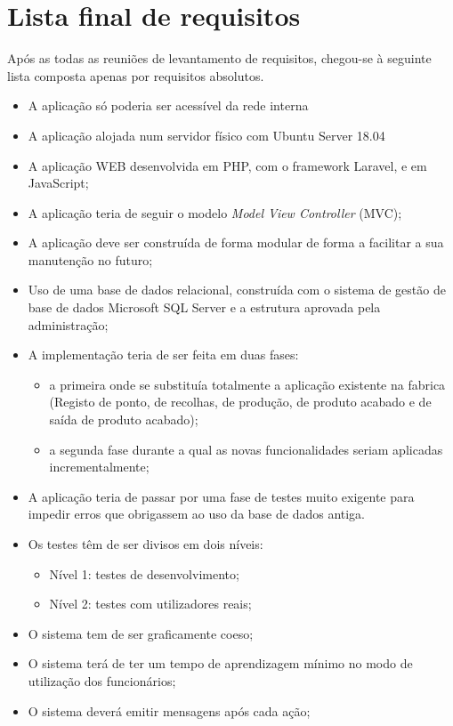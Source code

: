 \section{Lista final de requisitos}
Após as todas as reuniões de levantamento de requisitos, chegou-se à seguinte lista composta apenas por requisitos absolutos.
\begin{itemize}
	\item A aplicação só poderia ser acessível da rede interna
	\item A aplicação alojada num servidor físico com Ubuntu Server 18.04
	\item A aplicação WEB desenvolvida em PHP, com o framework Laravel, e em JavaScript;
	\item A aplicação teria de seguir o modelo \textit{Model View Controller} (MVC\label{sym:MVC});
	\item A aplicação deve ser construída de forma modular de forma a facilitar a sua manutenção no futuro;
	\item Uso de uma base de dados relacional, construída com o sistema de gestão de base de dados Microsoft SQL Server e a estrutura aprovada pela administração;
	\item A implementação teria de ser feita em duas fases:
	\begin{itemize}
		\item a primeira onde se substituía totalmente a aplicação existente na fabrica (Registo de ponto, de recolhas, de produção, de produto acabado e de saída de produto acabado);
		\item a segunda fase durante a qual as novas funcionalidades seriam aplicadas incrementalmente;
	\end{itemize}
	\item A aplicação teria de passar por uma fase de testes muito exigente para impedir erros que obrigassem ao uso da base de dados antiga.
	\item Os testes têm de ser divisos em dois níveis:
	\begin{itemize}
		\item Nível 1: testes de desenvolvimento;
		\item Nível 2: testes com utilizadores reais;
	\end{itemize}
	\item O sistema tem de ser graficamente coeso;
	\item O sistema terá de ter um tempo de aprendizagem mínimo no modo de utilização dos funcionários;
	\item O sistema deverá emitir mensagens após cada ação;

\end{itemize}
